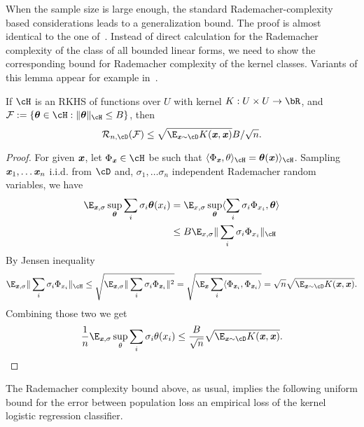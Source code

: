 When the sample size is large enough, the standard Rademacher-complexity based considerations leads to a generalization bound. The proof is almost identical to the one of~. Instead of direct calculation for the Rademacher complexity of the class of all bounded linear forms, we need to show the corresponding bound for Rademacher complexity of the kernel classes. Variants of this lemma appear for example in~\cite{bartlett2002rademacher}.
\begin{lemma}
\label{lem:rademacher-kernel}
    If $\cH$ is an RKHS of functions over $U$ with kernel $K : U\times U \to \bR$, and $\mathcal{F} := \{ \boldsymbol{\theta} \in \cH : \|\boldsymbol{\theta}\|_{\cH} \leq B \}$, then
    \begin{equation*}
        \mathcal{R}_{n, \cD}(\mathcal{F}) \leq \sqrt{\E_{\xx\sim \cD} K(\xx, \xx)} B / \sqrt{n}.
    \end{equation*}
\end{lemma}
\begin{proof}
    For given $\boldsymbol{\mathit{x}}$, let $\Phi_{\xx} \in \cH$ be such that $\langle \Phi_{\xx}, \theta\rangle_{\cH} = \boldsymbol{\theta}(\xx)\rangle_{\cH}$. Sampling $\boldsymbol{\mathit{x}}_1, \ldots \boldsymbol{\mathit{x}}_n$ i.i.d. from $\cD$ and, $\sigma_1, \ldots \sigma_n$ independent Rademacher random variables, we have
\begin{align*}
\E_{\xx, \sigma} \sup_{\boldsymbol{\theta}} \sum_i \sigma_i \boldsymbol{\theta}(x_i) & = \E_{x, \sigma} \sup_{\boldsymbol{\theta}} \langle \sum_i \sigma_i \Phi_{x_i}, \boldsymbol{\theta} \rangle \\
& \leq B \E_{x, \sigma} \|\sum_i \sigma_i\Phi_{x_i}\|_{\cH}
\end{align*}
    By Jensen inequality
    \begin{equation*}
        \E_{\xx, \sigma} \|\sum_i \sigma_i\Phi_{x_i}\|_{\cH} \leq \sqrt{\E_{\xx, \sigma}\|\sum_i \sigma_i \Phi_{\xx_i}\|^2} = \sqrt{\E_{\xx} \sum_i \langle \Phi_{\xx_i}, \Phi_{\xx_i}\rangle} = \sqrt{n} \sqrt{\E_{\xx \sim \cD} K(\xx, \xx)}.
    \end{equation*}
    Combining those two we get
    \begin{equation*}
        \frac{1}{n}\E_{\xx, \sigma} \sup_{\theta} \sum_i \sigma_i \theta(x_i) \leq \frac{B}{\sqrt{n}} \sqrt{\E_{\xx \sim \cD} K(\xx, \xx)}.
    \end{equation*}
\end{proof}

The Rademacher complexity bound above, as usual, implies the following uniform bound for the error between population loss an empirical loss of the kernel logistic regression classifier. 

